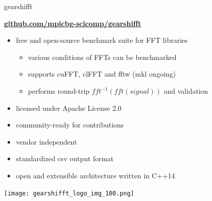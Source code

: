 \documentclass[t,11pt,hyperref={
  pdftitle = {gearshifft},
  pdfsubject = {gearshifft},
  pdfborder={0 0 0},
  colorlinks=true,
  urlcolor=red,
  citecolor=red,
  linkcolor=red,
  pdfauthor={Peter Steinbach, Matthias Werner}
  }
]{beamer}
\begin{document}
\begin{frame}{gearshifft}

\vfill
      \begin{center}\Large
        \href{https://github.com/mpicbg-scicomp/gearshifft}{\textbf{github.com/mpicbg-scicomp/gearshifft}}
      \end{center}

\vfill
  \begin{itemize}
  \item free and open-source benchmark suite for FFT libraries
    \begin{itemize}
    \item various conditions of FFTs can be benchmarked
    \item supports cuFFT, clFFT and fftw (mkl ongoing)
    \item performs round-trip $fft^{-1}(fft(signal))$ and validation
    \end{itemize}
    \pause
    \vfill
  \item licensed under Apache License 2.0
  \item community-ready for contributions
  \item vendor independent 
  \item standardized csv output format
  \item open and extensible architecture written in C++14
  \end{itemize}
\vfill
\pause
\begin{center}
  \texttt{[image: gearshifft\_logo\_img\_100.png]}
\end{center}

\vfill
\end{frame}
\end{document}
